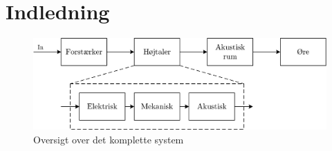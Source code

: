 \chapter{Indledning}
\lipsum[3]
\begin{figure}[H]
	\centering
	\includegraphics[scale=1]{Billeder/FullOverview}
	\caption{Oversigt over det komplette system}
\end{figure}